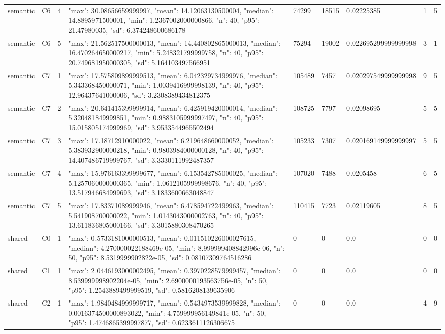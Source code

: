 \begin{tabular}{lllllllll}
semantic & C6 & 4 & {"max": 30.08656659999997, "mean": 14.12063130500004, "median": 14.8895971500001, "min": 1.2367002000000866, "n": 40, "p95": 21.47980035, "sd": 6.374248600686178} & 74299 & 18515 & 0.02225385 & 1 & 5 \\
semantic & C6 & 5 & {"max": 21.562517500000013, "mean": 14.440802865000013, "median": 16.470264650000217, "min": 5.248321799999758, "n": 40, "p95": 20.749681950000305, "sd": 5.164103497566951} & 75294 & 19002 & 0.022695299999999998 & 3 & 1 \\
semantic & C7 & 1 & {"max": 17.575809899999513, "mean": 6.042329734999976, "median": 5.343368450000071, "min": 1.0039416999998139, "n": 40, "p95": 12.96437641000006, "sd": 3.2308389434812375} & 105489 & 7457 & 0.020297549999999998 & 9 & 5 \\
semantic & C7 & 2 & {"max": 20.641415399999914, "mean": 6.425919420000014, "median": 5.320481849999851, "min": 0.9883105999997497, "n": 40, "p95": 15.015805174999969, "sd": 3.9533544965502494} & 108725 & 7797 & 0.02098695 & 5 & 5 \\
semantic & C7 & 3 & {"max": 17.18712910000022, "mean": 6.219648660000052, "median": 5.383932900000218, "min": 0.9803984000000128, "n": 40, "p95": 14.407486719999767, "sd": 3.3330111992487357} & 105233 & 7307 & 0.020169149999999997 & 5 & 5 \\
semantic & C7 & 4 & {"max": 15.976163399999677, "mean": 6.153542785000025, "median": 5.1257060000000365, "min": 1.0612105999998676, "n": 40, "p95": 13.517946684999693, "sd": 3.1833600663048847} & 107020 & 7488 & 0.0205458 & 6 & 5 \\
semantic & C7 & 5 & {"max": 17.83371089999946, "mean": 6.478594722499963, "median": 5.541908700000022, "min": 1.0143043000002763, "n": 40, "p95": 13.611836805000166, "sd": 3.3015880308470265} & 110415 & 7723 & 0.02119605 & 8 & 5 \\
shared & C0 & 1 & {"max": 0.5733181000000513, "mean": 0.011510226000027615, "median": 4.270000022188469e-05, "min": 8.999999408842996e-06, "n": 50, "p95": 8.5319999902822e-05, "sd": 0.08107309764516286} & 0 & 0 & 0.0 & 0 & 0 \\
shared & C1 & 1 & {"max": 2.0446193000002495, "mean": 0.3970228579999457, "median": 8.539999998902204e-05, "min": 2.6900000193563756e-05, "n": 50, "p95": 1.2543889499999519, "sd": 0.5816208139635906} & 0 & 0 & 0.0 & 0 & 0 \\
shared & C2 & 1 & {"max": 1.9840484999999717, "mean": 0.5434973539999828, "median": 0.0016374500000893022, "min": 4.759999956149841e-05, "n": 50, "p95": 1.4746865399997877, "sd": 0.6233611126306675} & 0 & 0 & 0.0 & 4 & 9 \\

\end{tabular}
